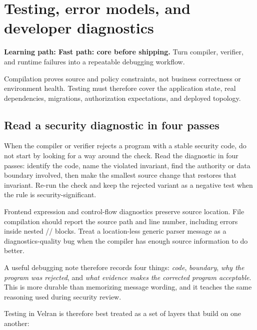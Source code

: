 \chapter{Testing, error models, and developer diagnostics}

\noindent\textbf{Learning path: Fast path: core before shipping.} Turn compiler, verifier, and runtime failures into a repeatable debugging workflow.\par\medskip


Compilation proves source and policy constraints, not business correctness or environment health. Testing must therefore cover the application state, real dependencies, migrations, authorization expectations, and deployed topology.

\section{Read a security diagnostic in four passes}

When the compiler or verifier rejects a program with a stable security code, do not start by looking for a way around the check. Read the diagnostic in four passes: identify the code, name the violated invariant, find the authority or data boundary involved, then make the smallest source change that restores that invariant. Re-run the check and keep the rejected variant as a negative test when the rule is security-significant.

Frontend expression and control-flow diagnostics preserve source location. File compilation should report the source path and line number, including errors inside nested // blocks. Treat a location-less generic parser message as a diagnostics-quality bug when the compiler has enough source information to do better.

A useful debugging note therefore records four things: \emph{code}, \emph{boundary}, \emph{why the program was rejected}, and \emph{what evidence makes the corrected program acceptable}. This is more durable than memorizing message wording, and it teaches the same reasoning used during security review.

Testing in Velran is therefore best treated as a set of layers that build on one another:

